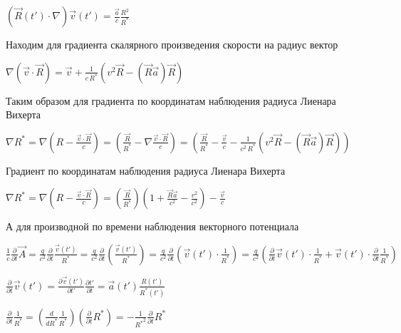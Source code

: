 \documentclass[11pt]{article}
\begin{document}
    \(\left(\overrightarrow{R}\left(t'\right) \cdot \nabla\right) \overrightarrow{v}\left(t'\right)  = \frac{\vec a}{c} \frac{R^2}{{{R}^{*}}}\)

    Находим для градиента скалярного произведения скорости на радиус вектор

\(\nabla \left(\overrightarrow{v}\cdot \overrightarrow{R}\right)  = \vec v + \frac{1}{c\,{{R}^{*}}}\left(v^2 \vec R - \left(\vec R \vec a\right) \vec R\right)\)

    Таким образом для градиента по координатам наблюдения радиуса Лиенара
Вихерта

\(\nabla {{R}^{*}}  = \nabla {\left( R-\frac{\overrightarrow{v}\cdot \overrightarrow{R}}{c} \right)}  = {\left( \frac{\vec R}{{R}^{*}}-\nabla \frac{\overrightarrow{v}\cdot \overrightarrow{R}}{c} \right)}  = {\left( \frac{\vec R}{{R}^{*}}- \frac{\vec v}{c} - \frac{1}{c^2\,{{R}^{*}}}\left(v^2 \vec R - \left(\vec R \vec a\right) \vec R\right) \right)}\)

    Градиент по координатам наблюдения радиуса Лиенара Вихерта

\(\nabla {{R}^{*}} = \nabla {\left( R-\frac{\overrightarrow{v}\cdot \overrightarrow{R}}{c} \right)} = \left(\frac{\vec{R}}{{{R}^{*}}}\right)\left(1 + \frac{\vec{R}\vec{a}}{c^2}-\frac{v^2}{c^2}\right)-\frac{\vec{v}}{c}\)

    А для производной по времени наблюдения векторного потенциала

\(\frac{1}{c}\frac{\partial }{\partial t}\overrightarrow{A}  = \frac{q}{c^2}\frac{\partial }{\partial t}\frac{\overrightarrow{v}\left(t'\right)}{{{R}^{*}}}  = \frac{q}{c^2}\frac{\partial }{\partial t}\left(\frac{\overrightarrow{v}\left(t'\right)}{{{R}^{*}}}\right)  = \frac{q}{c^2}\frac{\partial }{\partial t}\left(\overrightarrow{v}\left(t'\right) \cdot \frac{1}{{{R}^{*}}}\right)  = \frac{q}{c^2}\left(\frac{\partial }{\partial t}\overrightarrow{v}\left(t'\right) \cdot \frac{1}{{{R}^{*}}} + \overrightarrow{v}\left(t'\right) \cdot \frac{\partial }{\partial t}\frac{1}{{{R}^{*}}}\right)\)

    \(\frac{\partial }{\partial t}\overrightarrow{v}\left(t'\right) = \frac{\partial \overrightarrow{v}\left(t'\right)}{\partial t'}\frac{\partial t'}{\partial t} = \vec a\left(t'\right) \frac{R\left(t'\right)}{{{R}^{*}}\left(t'\right)}\)

    \(\frac{\partial }{\partial t}\frac{1}{{{R}^{*}}} = \left(\frac{d}{d{{R}^{*}}}\frac{1}{{{R}^{*}}}\right)\left(\frac{\partial }{\partial t} {{R}^{*}}\right) = -\frac{1}{{{R}^{*}}^2}\frac{\partial }{\partial t} {{R}^{*}}\)
\end{document}

